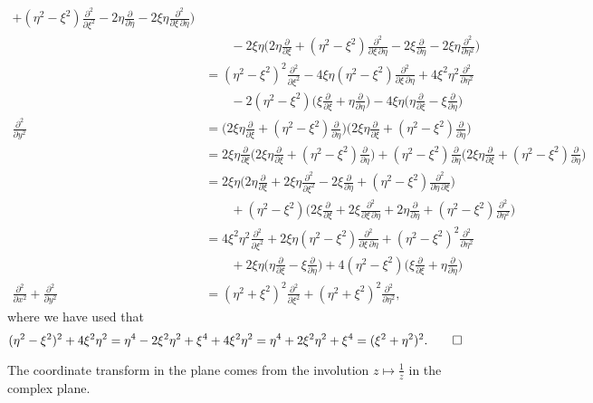 \begin{loesung}
\begin{teilaufgaben}
\begin{align*}
+
(\eta^2-\xi^2)\frac{\partial^2}{\partial\xi^2}
-2\eta\frac{\partial}{\partial\eta}
-2\xi\eta\frac{\partial^2}{\partial\xi\,\partial\eta}
\biggr)
\\
&\qquad
-2\xi\eta\biggl(
2\eta\frac{\partial}{\partial\xi}
+
(\eta^2-\xi^2)\frac{\partial^2}{\partial\xi\,\partial\eta}
-2\xi\frac{\partial}{\partial\eta}
-2\xi\eta\frac{\partial^2}{\partial\eta^2}
\biggr)
\\
&=
(\eta^2-\xi^2)^2\frac{\partial^2}{\partial\xi^2}
-
4\xi\eta(\eta^2-\xi^2)
\frac{\partial^2}{\partial\xi\,\partial\eta}
+4\xi^2\eta^2
\frac{\partial^2}{\partial\eta^2}
\\
&\qquad
-
2(\eta^2-\xi^2)\bigg(
\xi\frac{\partial}{\partial\xi}+\eta\frac{\partial}{\partial\eta}
\biggr)
-4\xi\eta\biggl(
\eta\frac{\partial}{\partial\xi}-\xi\frac{\partial}{\partial\eta}
\biggr)
\\
\frac{\partial^2}{\partial y^2}
&=
\biggl(
2\xi\eta
\frac{\partial}{\partial\xi}
+
(\eta^2-\xi^2)
\frac{\partial}{\partial\eta}
\biggr)
\biggl(
2\xi\eta
\frac{\partial}{\partial\xi}
+
(\eta^2-\xi^2)
\frac{\partial}{\partial\eta}
\biggr)
\\
&=
2\xi\eta
\frac{\partial}{\partial\xi}
\biggl(
2\xi\eta
\frac{\partial}{\partial\xi}
+
(\eta^2-\xi^2)
\frac{\partial}{\partial\eta}
\biggr)
+(\eta^2-\xi^2)\frac{\partial}{\partial\eta}
\biggl(
2\xi\eta
\frac{\partial}{\partial\xi}
+
(\eta^2-\xi^2)
\frac{\partial}{\partial\eta}
\biggr)
\\
&=
2\xi\eta
\biggl(
2\eta\frac{\partial}{\partial\xi}
+2\xi\eta\frac{\partial^2}{\partial\xi^2}
-2\xi\frac{\partial}{\partial\eta}
+(\eta^2-\xi^2)\frac{\partial^2}{\partial\eta\,\partial\xi}
\biggr)
\\
&\qquad
+(\eta^2-\xi^2)
\biggl(
2\xi\frac{\partial}{\partial\xi}
+
2\xi\frac{\partial^2}{\partial\xi\,\partial\eta}
+
2\eta\frac{\partial}{\partial\eta}
+
(\eta^2-\xi^2)\frac{\partial^2}{\partial\eta^2}
\biggr)
\\
&=
4\xi^2\eta^2\frac{\partial^2}{\partial\xi^2}
+
2\xi\eta(\eta^2-\xi^2)
\frac{\partial^2}{\partial\xi\,\partial\eta}
+(\eta^2-\xi^2)^2\frac{\partial^2}{\partial\eta^2}
\\
&\qquad
+2\xi\eta\biggl(
\eta\frac{\partial}{\partial\xi}-\xi\frac{\partial}{\partial\eta}
\biggl)
+
4(\eta^2-\xi^2)\biggl(
\xi\frac{\partial}{\partial\xi}
+
\eta\frac{\partial}{\partial\eta}
\biggr)
\\
\frac{\partial^2}{\partial x^2}
+
\frac{\partial^2}{\partial y^2}
&=
(\eta^2+\xi^2)^2\frac{\partial^2}{\partial\xi^2}
+
(\eta^2+\xi^2)^2\frac{\partial^2}{\partial\eta^2},
\end{align*}
\endgroup
where we have used that
\[
(\eta^2-\xi^2)^2+4\xi^2\eta^2
=
\eta^4-2\xi^2\eta^2 +\xi^4 + 4\xi^2\eta^2
=
\eta^4+2\xi^2\eta^2 +\xi^4
=
(\xi^2+\eta^2)^2.
\qedhere
\]
\end{teilaufgaben}
\end{loesung}

\begin{diskussion}
The coordinate transform in the plane comes from the involution
$z\mapsto\frac1z$ in the complex plane.
\end{diskussion}
